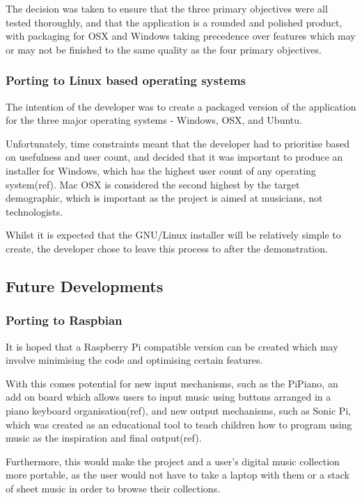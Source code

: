 The decision was taken to ensure that the three primary objectives were all tested thoroughly, and that the application is a rounded and polished product, with packaging for OSX and Windows taking precedence over features which may or may not be finished to the same quality as the four primary objectives.

\subsubsection{Porting to Linux based operating systems}
The intention of the developer was to create a packaged version of the application for the three major operating systems - Windows, OSX, and Ubuntu. 

Unfortunately, time constraints meant that the developer had to prioritise based on usefulness and user count, and decided that it was important to produce an installer for Windows, which has the highest user count of any operating system(ref). Mac OSX is considered the second highest by the target demographic, which is important as the project is aimed at musicians, not technologists.

Whilst it is expected that the GNU/Linux installer will be relatively simple to create, the developer chose to leave this process to after the demonstration.

\subsection{Future Developments}
\subsubsection{Porting to Raspbian}
It is hoped that a Raspberry Pi compatible version can be created which may involve minimising the code and optimising certain features. 

With this comes potential for new input mechanisms, such as the PiPiano, an add on board which allows users to input music using buttons arranged in a piano keyboard organisation(ref), and new output mechanisms, such as Sonic Pi, which was created as an educational tool to teach children how to program using music as the inspiration and final output(ref). 

Furthermore, this would make the project and a user's digital music collection more portable, as the user would not have to take a laptop with them or a stack of sheet music in order to browse their collections.


